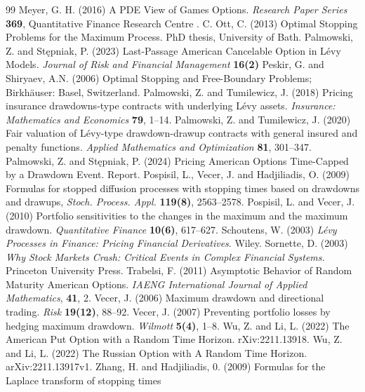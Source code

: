\documentclass[10pt,a4paper]{amsart}
\renewcommand{\c}[1]{\k{#1}}
\begin{document}
\begin{thebibliography}{99}
 Meyer, G. H.  (2016) A PDE View of Games Options. {\it Research Paper Series} {\bf 369}, Quantitative Finance Research Centre .
 C. Ott, C. (2013) Optimal Stopping Problems for the Maximum Process. PhD thesis, University of Bath.
 Palmowski, Z. and St\c{e}pniak, P. (2023) Last-Passage American Cancelable Option in L\'evy Models. {\it Journal of Risk and Financial Management} {\bf 16(2)}
 Peskir, G. and Shiryaev, A.N. (2006) Optimal Stopping and Free-Boundary Problems; Birkh\"{a}user: Basel, Switzerland.
 Palmowski, Z. and Tumilewicz, J. (2018)
			Pricing insurance drawdowns-type contracts with underlying L\'evy assets.
			{\it Insurance: Mathematics and Economics} {\bf 79}, 1--14.
 Palmowski, Z. and Tumilewicz, J. (2020)
			Fair valuation of L\'evy-type drawdown-drawup contracts with general insured and penalty functions.
			{\it Applied Mathematics and Optimization} {\bf 81}, 301--347.
 Palmowski, Z. and St\c{e}pniak, P. (2024)
			Pricing American Options Time-Capped by a Drawdown Event.
			Report. %
 Pospisil, L., Vecer, J. and Hadjiliadis, O. (2009) Formulas for stopped diffusion processes with stopping times based on drawdowns and drawups,
			{\it Stoch. Process. Appl.} {\bf 119(8)}, 2563--2578.
 Pospisil, L. and Vecer, J. (2010) Portfolio sensitivities to the changes in the maximum and
			the maximum drawdown. {\it Quantitative Finance} {\bf 10(6)}, 617--627.
 Schoutens, W. (2003)
			{\it {L}\'evy Processes in Finance: Pricing Financial Derivatives}.
			Wiley.
 Sornette, D. (2003) {\it Why Stock Markets Crash: Critical Events in Complex Financial Systems.}
			Princeton University Press.
 Trabelsi, F. (2011) Asymptotic Behavior of Random Maturity American Options. {\it IAENG International Journal of Applied Mathematics}, {\bf 41}, 2.
 Vecer, J. (2006) Maximum drawdown and directional trading. {\it Risk} {\bf 19(12)}, 88--92.
 Vecer, J. (2007) Preventing portfolio losses by hedging maximum drawdown. {\it Wilmott} {\bf 5(4)},
			1--8.
 Wu, Z. and Li, L. (2022) The American Put Option with a Random Time Horizon. rXiv:2211.13918.
 Wu, Z. and Li, L. (2022) The Russian Option with A Random Time Horizon. arXiv:2211.13917v1.
 Zhang, H. and Hadjiliadis, 0. (2009) Formulas for the Laplace transform of stopping times

\end{thebibliography}
\end{document}
